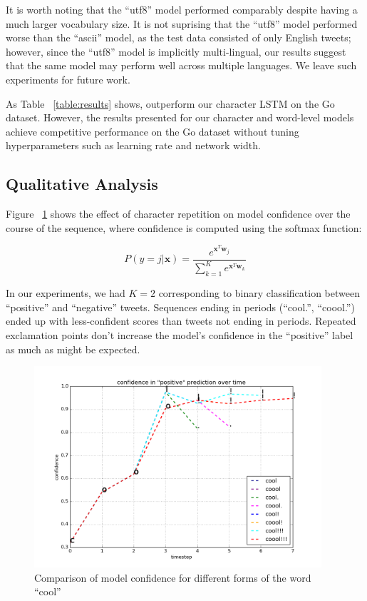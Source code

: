 \documentclass{article} %
\begin{document}
It is worth noting that the ``utf8'' model performed comparably despite having a much larger vocabulary size. It is not suprising that the ``utf8'' model performed worse than the ``ascii'' model, as the test data consisted of only English tweets; however, since the ``utf8'' model is implicitly multi-lingual, our results suggest that the same model may perform well across multiple languages. We leave such experiments for future work.

As Table ~\ref{table:results} shows, \cite{kalchbrenner2014convolutional} outperform our character LSTM on the Go dataset. However, the results presented for our character and word-level models achieve competitive performance on the Go dataset without tuning hyperparameters such as learning rate and network width. 

\subsection{Qualitative Analysis}
Figure ~\ref{fig:cool} shows the effect of character repetition on model confidence over the course of the sequence, where confidence is computed using the softmax function:

$$P(y = j|\mathbf{x}) = \frac{e^{\mathbf{x}^T \mathbf{w}_j}}{\sum_{k=1}^{K} e^{\mathbf{x}^T \mathbf{w}_k}}$$

In our experiments, we had $K = 2$ corresponding to binary classification between ``positive'' and ``negative'' tweets. Sequences ending in periods (``cool.'', ``coool.'') ended up with less-confident scores than tweets not ending in periods. Repeated exclamation points don't increase the model's confidence in the ``positive'' label as much as might be expected. 

\begin{figure}[h!]
\begin{center}
\includegraphics[width=0.95\textwidth]{figs/cool}
\end{center}
\caption{Comparison of model confidence for different forms of the word ``cool''}
\label{fig:cool}
\end{figure}
\end{document}
